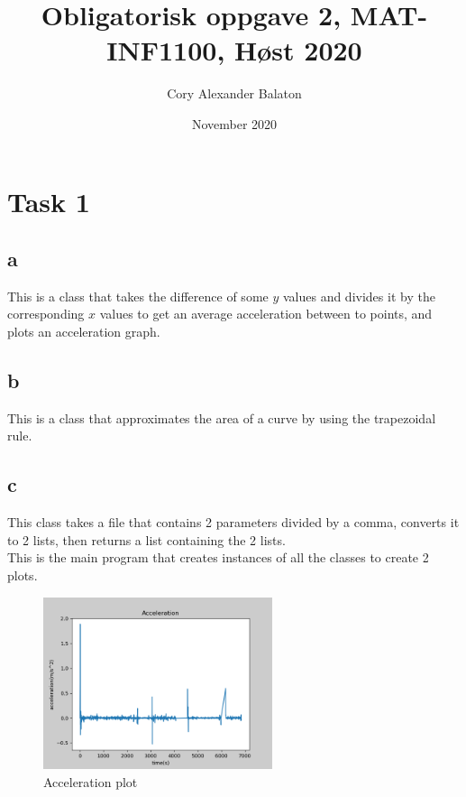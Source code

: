 \documentclass{article}
\title{Obligatorisk oppgave 2, MAT-INF1100, Høst 2020}
\author{Cory Alexander Balaton}
\date{November 2020}
\begin{document}
\maketitle
\newpage

\section*{Task 1}

\subsection*{a}

This is a class that takes the difference of some $y$ values and divides it by the corresponding $x$ values to get an
average acceleration between to points, and plots an acceleration graph. \\

\newpage

\subsection*{b}

This is a class that approximates the area of a curve by using the trapezoidal rule. \\

\newpage

\subsection*{c}

This class takes a file that contains 2 parameters divided by a comma, converts it to 2 lists, then returns
a list containing the 2 lists. \\


This is the main program that creates instances of all the classes to create 2 plots. \\

\newpage

\begin{figure}[h]
    \centering
    \includegraphics[width=0.6\textwidth]{Accel}
    \caption{Acceleration plot}
    \label{fig:accel}
\end{figure}
\end{document}
